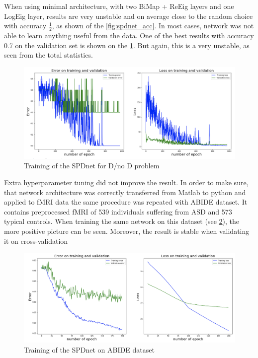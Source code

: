\documentclass[12pt]{extarticle}
\theoremstyle{definition}
\theoremstyle{remark}
\begin{document}
	When using minimal architecture, with two BiMap + ReEig layers and one LogEig layer, results are very unstable and on average close to the random choice with accuracy $\frac12$, as shown of the \cref{fig:spdnet_acc}. In most cases, network was not able to learn anything useful from the data. One of the best results with accuracy 0.7 on the validation set is shown on the \cref{fig:spdnet_train}. But again, this is a very unstable, as seen from the total statistics. 
	
	\begin{figure}[H]
		\centering
		\includegraphics[width=\linewidth]{pic/depr.png}
		\caption{Training of the SPDnet for D/no D problem}
		\label{fig:spdnet_train}
	\end{figure}
	
	Extra hyperparameter tuning did not improve the result. In order to make sure, that network architecture was correctly transferred from Matlab to python and applied to fMRI data the same procedure was repeated with ABIDE dataset\cite{Craddock2013}. It contains preprocessed fMRI of 539 individuals suffering from ASD and 573 typical controls. When training the same network on this dataset (see \cref{fig:spdnet_abide}), the more positive picture can be seen. Moreover, the result is stable when validating it on cross-validation
	
	\begin{figure}[H]
		\centering
		\includegraphics[width=\linewidth]{pic/abide.png}
		\caption{Training of the SPDnet on ABIDE dataset}
		\label{fig:spdnet_abide}
	\end{figure}
	
\end{document}
